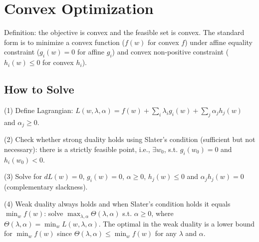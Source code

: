 \section{Convex Optimization}

Definition: the objective is convex and the feasible set is convex. The standard form is to minimize a convex function ($f(w)$ for convex $f$) under affine equality constraint ($g_i(w)=0$ for affine $g_i$) and convex non-positive constraint ($h_i(w)\le 0$ for convex $h_i$).

\subsection*{How to Solve}

(1) Define Lagrangian: $L(w, \lambda, \alpha) = f(w)+\sum_i \lambda_i g_i(w) + \sum_j \alpha_j h_j(w)$ and $\alpha_j\ge 0$.

(2) Check whether strong duality holds using Slater's condition (sufficient but not necessary): there is a strictly feasible point, i.e., $\exists w_0$, s.t. $g_i(w_0)=0$ and $h_i(w_0)<0$.

(3) Solve for $dL(w)=0$, $g_i(w)=0$,  $\alpha\ge 0$, $h_j(w)\le 0$ and $\alpha_j h_j(w) = 0$ (complementary slackness).

(4) Weak duality always holds and when Slater's condition holds it equals  $\min_w f(w)$: solve $\max_{\lambda, \alpha} \Theta(\lambda, \alpha)$ s.t. $\alpha\ge 0$, where $\Theta(\lambda, \alpha) = \min_w L(w, \lambda, \alpha)$. The optimal in the weak duality is a lower bound for $\min_w f(w)$ since $\Theta(\lambda, \alpha)\le \min_w f(w)$ for any $\lambda$ and $\alpha$.